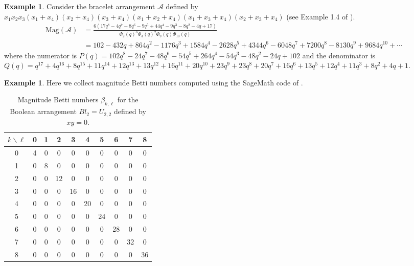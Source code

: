 \documentclass{amsart}
\numberwithin{equation}{section}
\theoremstyle{plain}
\theoremstyle{remark}
\theoremstyle{definition}
\newtheorem{ex}[thm]{Example}
\numberwithin{equation}{section}
\newcommand{\A}{\mathcal{A}}
\newcommand{\Mag}{\mathrm{Mag}}
\begin{document}
\begin{ex}
    Consider the bracelet arrangement $\A$ defined by $x_1x_2x_3(x_1+x_4)(x_2+x_4)(x_3+x_4)(x_1+x_2+x_4)(x_1+x_3+x_4)(x_2+x_3+x_4)$ (see Example 1.4 of \cite{Denham2026}).
    \begin{align*}
        \Mag(\A)&=\frac{6(17q^8-4q^7-8q^6-9q^5+44q^4-9q^3-8q^2-4q+17)}{\Phi_2(q)^3\Phi_3(q)^2\Phi_9(q)\Phi_{10}(q)}\\
        &=102-432q+864q^2-1176q^3+1584q^4-2628q^5+4344q^6-6048q^7+7200q^8-8130q^9+9684q^{10}+\cdots
    \end{align*}
    where the numerator is $P(q)=102q^8-24q^7-48q^6-54q^5+264q^4-54q^3-48q^2-24q+102$ and the denominator is $Q(q)=q^{17}+4q^{16}+8q^{15}+11q^{14}+12q^{13}+13q^{12}+16q^{11}+20q^{10}+23q^9+23q^8+20q^7+16q^6+13q^5+12q^4+11q^3+8q^2+4q+1$.
\end{ex}



\begin{ex}\label{ex:MH_tables}
Here we collect magnitude Betti numbers computed using the SageMath code of \cite{Hepworth2017}.
\end{ex}

\begin{table}[htpb]
\centering
\begin{tabular}{c|ccccccccc}
\hline
$k \backslash \ell$ & 0 & 1 & 2 & 3 & 4 & 5 & 6 & 7 & 8 \\
\hline
0 & 4 & 0  & 0  & 0   & 0   & 0   & 0   & 0  & 0 \\
1 & 0  & 8 & 0  & 0   & 0   & 0   & 0   & 0  & 0\\
2 & 0  & 0  & 12 & 0  & 0   & 0   & 0   & 0  & 0\\
3 & 0  & 0  & 0  & 16 & 0  & 0  & 0   & 0  & 0\\
4 & 0  & 0  & 0  & 0   & 20 & 0  & 0  & 0  & 0\\
5 & 0  & 0  & 0  & 0   & 0   & 24 & 0  & 0  & 0\\
6 & 0  & 0  & 0  & 0   & 0   & 0   & 28 & 0  & 0\\
7 & 0  & 0  & 0  & 0   & 0   & 0   & 0   & 32 & 0\\
8 & 0  & 0  & 0  & 0   & 0   & 0   & 0   & 0 & 36\\
\hline
\end{tabular}
\vspace{1ex}
\caption{Magnitude Betti numbers $\beta_{k,\ell}$ for the Boolean arrangement $Bl_2=U_{2,2}$ defined by $xy=0$.}
\label{tab:Bool2}
\end{table}
    
\end{document}
